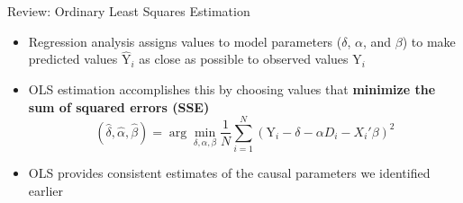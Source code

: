\documentclass[dvipsnames,hyperref={pdfpagelabels=false}]{beamer}
\begin{document}
\begin{frame}{Review: Ordinary Least Squares Estimation}
	\begin{itemize}
		\item Regression analysis assigns values to model parameters ($\delta$, $\alpha$, and $\beta$) to make predicted values $\hat{\mathrm{Y}}_i$ as close as possible to observed values $\mathrm{Y}_i$ 
		\vspace{0.3cm}
		
		\item OLS estimation accomplishes this by choosing values that \textbf{minimize the sum of squared errors (SSE)}
		\begin{equation*}
			(\hat{\delta},\hat{\alpha},\hat{\beta})= \arg\min_{\delta,\alpha,\beta}\dfrac{1}{N}\sum^N_{i=1}(\mathrm{Y}_i-\delta-\alpha D_i-X_i'\beta)^2
		\end{equation*}
		\vspace{0.3cm}
		
		
		\item OLS provides consistent estimates of the causal parameters we identified earlier
		
	\end{itemize}
\end{frame}


%
%
%
%
%
%	
%	
%
\end{document}
